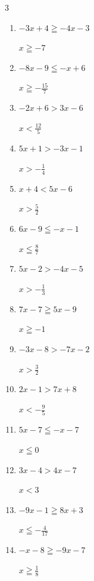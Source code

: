 \begin{multicols}{3}
\begin{enumerate}
\columnbreak %

\resetques

  \item $-3x+4\geqq -4x-3$

        $\displaystyle x\geqq -7$

  \item $-8x-9\leqq -x+6$

        $\displaystyle x\geqq -\frac{15}{7}$

  \item $-2x+6>3x-6$

        $\displaystyle x<\frac{12}{5}$

  \item $5x+1>-3x-1$

        $\displaystyle x>-\frac{1}{4}$

  \item $x+4<5x-6$

        $\displaystyle x>\frac{5}{2}$

  \item $6x-9\leqq -x-1$

        $\displaystyle x\leqq \frac{8}{7}$

  \item $5x-2>-4x-5$

        $\displaystyle x>-\frac{1}{3}$

  \item $7x-7\geqq 5x-9$

        $\displaystyle x\geqq -1$

  \item $-3x-8>-7x-2$

        $\displaystyle x>\frac{3}{2}$

  \item $2x-1>7x+8$

        $\displaystyle x<-\frac{9}{5}$

  \item $5x-7\leqq -x-7$

        $\displaystyle x\leqq 0$

  \item $3x-4>4x-7$

        $\displaystyle x<3$

  \item $-9x-1\geqq 8x+3$

        $\displaystyle x\leqq -\frac{4}{17}$

  \item $-x-8\geqq -9x-7$

        $\displaystyle x\geqq \frac{1}{8}$


\end{enumerate}
\end{multicols}
